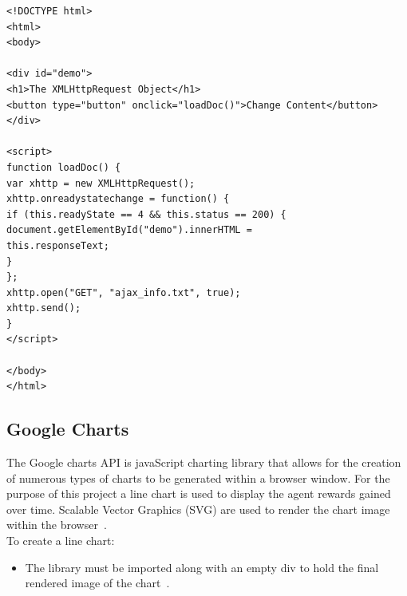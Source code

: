 \begin{verbatim}
<!DOCTYPE html>
<html>
<body>

<div id="demo">
<h1>The XMLHttpRequest Object</h1>
<button type="button" onclick="loadDoc()">Change Content</button>
</div>

<script>
function loadDoc() {
var xhttp = new XMLHttpRequest();
xhttp.onreadystatechange = function() {
if (this.readyState == 4 && this.status == 200) {
document.getElementById("demo").innerHTML =
this.responseText;
}
};
xhttp.open("GET", "ajax_info.txt", true);
xhttp.send();
}
</script>

</body>
</html>
\end{verbatim}


\subsection{Google Charts}
The Google charts API is javaScript charting library that allows for the creation of numerous types of charts to be generated within a browser window. For the purpose of this project a line chart is used to display the agent rewards gained over time. Scalable Vector Graphics (SVG) are used to render the chart image within the browser~\cite{GoogleLineChart:online}.\\
To create a line chart:
\begin{itemize}
	\item The library must be imported along with an empty div to hold the final rendered image of the chart~\cite{GoogleLineChart:online}.

\end{itemize}

